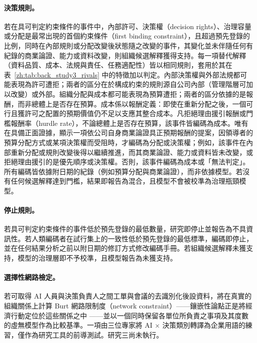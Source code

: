 \paragraph{決策規則。}若在具可判定約束條件的事件中，內部許可、決策權（decision rights）、治理容量或分配是最常出現的首個約束條件（first binding constraint），且超過預先登錄的比例，同時在內部規則或分配改變後狀態隨之改變的事件，其變化並未伴隨任何有紀錄的商業論證、能力或資料改變，則組織候選解釋獲得支持。每一項替代解釋（資料品質、成本、法規與責任、任務適配性）皆以相同規則，套用於其在表~\ref{zh:tab:back_study3_rivals} 中的特徵加以判定。內部決策權與外部法規都可能表現為許可遭拒；兩者的區分在於構成約束的規則源自公司內部（管理階層可加以改變）或外部。組織分配與成本都可能表現為預算遭拒；兩者的區分依據的是報酬，而非總體上是否存在預算。成本係以報酬定義：即使在重新分配之後，一個可行且獲許可之配置的預期價值仍不足以支應其整合成本。凡拒絕理由援引報酬或門檻報酬率（hurdle rate），不論總體上是否存在預算，該事件皆編碼為成本。唯有在具備正面證據，顯示一項依公司自身商業論證具正預期報酬的提案，因領導者的預算分配方式或某項決策權而受阻時，才編碼為分配或決策權；例如，該事件在內部重新分配或規則改變後得以繼續推進，而其商業論證、能力或資料皆未改變，或拒絕理由援引的是優先順序或決策權。否則，該事件編碼為成本或「無法判定」。所有編碼皆依據附日期的紀錄（例如預算分配與商業論證），而非依據模型。若沒有任何候選解釋達到門檻，結果即報告為混合，且模型不會被校準為治理瓶頸模型。

\paragraph{停止規則。}若具可判定約束條件的事件低於預先登錄的最低數量，研究即停止並報告為不具資訊性。若人類編碼者在試行集上的一致性低於預先登錄的最低標準，編碼即停止，並在任何結果分析之前以附日期的修訂方式修改編碼手冊。若組織候選解釋未獲支持，模型的治理層即不予校準，且模型報告為未獲支持。

\paragraph{選擇性網路檢定。}若可取得 AI 人員與決策負責人之間工單與會議的去識別化後設資料，將在真實的組織關係上計算 Burt 網路限制度（network constraint）\citep{burt1992structural}——鑲嵌性論點正是將經濟行動定位於這些關係之中 \citep{granovetter1985economic}——並以一個同時保留各單位所負責之事項及其度數的虛無模型作為比較基準。一項由三位專家將 AI $\times$ 決策類別轉譯為企業用語的練習，僅作為研究工具的前導測試。研究三尚未執行。

